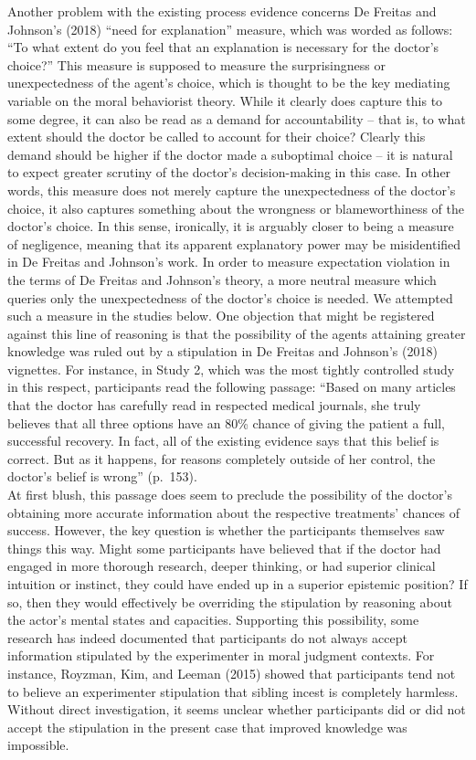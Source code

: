 \documentclass[
  man,floatsintext]{apa6}
\begin{document}
Another problem with the existing process evidence concerns De Freitas and Johnson's (2018) ``need for explanation'' measure, which was worded as follows: ``To what extent do you feel that an explanation is necessary for the doctor's choice?'' This measure is supposed to measure the surprisingness or unexpectedness of the agent's choice, which is thought to be the key mediating variable on the moral behaviorist theory. While it clearly does capture this to some degree, it can also be read as a demand for accountability -- that is, to what extent should the doctor be called to account for their choice? Clearly this demand should be higher if the doctor made a suboptimal choice -- it is natural to expect greater scrutiny of the doctor's decision-making in this case. In other words, this measure does not merely capture the unexpectedness of the doctor's choice, it also captures something about the wrongness or blameworthiness of the doctor's choice. In this sense, ironically, it is arguably closer to being a measure of negligence, meaning that its apparent explanatory power may be misidentified in De Freitas and Johnson's work. In order to measure expectation violation in the terms of De Freitas and Johnson's theory, a more neutral measure which queries only the unexpectedness of the doctor's choice is needed. We attempted such a measure in the studies below. One objection that might be registered against this line of reasoning is that the possibility of the agents attaining greater knowledge was ruled out by a stipulation in De Freitas and Johnson's (2018) vignettes. For instance, in Study 2, which was the most tightly controlled study in this respect, participants read the following passage: ``Based on many articles that the doctor has carefully read in respected medical journals, she truly believes that all three options have an 80\% chance of giving the patient a full, successful recovery. In fact, all of the existing evidence says that this belief is correct. But as it happens, for reasons completely outside of her control, the doctor's belief is wrong'' (p.~153).\\
At first blush, this passage does seem to preclude the possibility of the doctor's obtaining more accurate information about the respective treatments' chances of success. However, the key question is whether the participants themselves saw things this way. Might some participants have believed that if the doctor had engaged in more thorough research, deeper thinking, or had superior clinical intuition or instinct, they could have ended up in a superior epistemic position? If so, then they would effectively be overriding the stipulation by reasoning about the actor's mental states and capacities. Supporting this possibility, some research has indeed documented that participants do not always accept information stipulated by the experimenter in moral judgment contexts. For instance, Royzman, Kim, and Leeman (2015) showed that participants tend not to believe an experimenter stipulation that sibling incest is completely harmless. Without direct investigation, it seems unclear whether participants did or did not accept the stipulation in the present case that improved knowledge was impossible.\\
\end{document}
